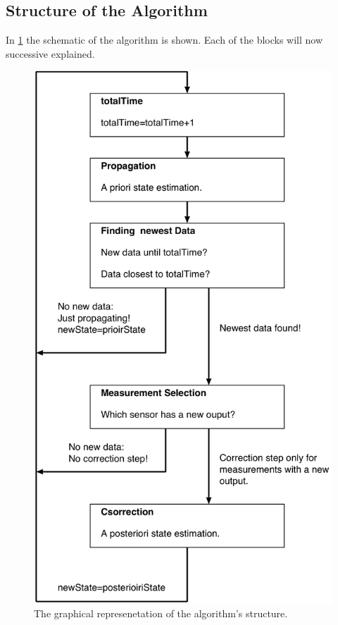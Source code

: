 \subsection*{Structure of the Algorithm}
In \ref{structure_algo} the schematic of the algorithm is shown. Each of the blocks will now successive explained.
\begin{figure}
\begin{center}
\includegraphics[width=8 cm]{pictures/structure_algo_2.png}
\caption{The graphical represenetation of the algorithm's structure.}
\label{structure_algo}
\end{center}
\end{figure}


